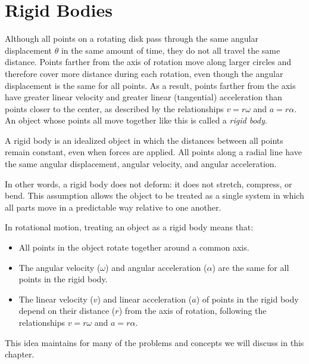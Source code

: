 \section{Rigid Bodies}
Although all points on a rotating disk pass through the same angular displacement $ \theta $ in the same amount of time, they do not all travel the same distance. Points farther from the axis of rotation move along larger circles and therefore cover more distance during each rotation, even though the angular displacement is the same for all points. As a result, points farther from the axis have greater linear velocity and greater linear (tangential) acceleration than points closer to the center, as described by the relationships $ v = r\omega $ and $ a = r\alpha $. An object whose points all move together like this is called a \emph{rigid body}.

A rigid body is an idealized object in which the distances between all points remain constant, even when forces are applied. All points along a radial line have the same angular displacement, angular velocity, and angular acceleration.

In other words, a rigid body does not deform: it does not stretch, compress, or bend. This assumption allows the object to be treated as a single system in which all parts move in a predictable way relative to one another.

In rotational motion, treating an object as a rigid body means that:

\begin{itemize}
  \item All points in the object rotate together around a common axis.
  \item The angular velocity ($\omega$) and angular acceleration ($\alpha$) are the same for all points in the rigid body.
  \item The linear velocity ($v$) and linear acceleration ($a$) of points in the rigid body depend on their distance ($r$) from the axis of rotation, following the relationships $v = r\omega$ and $a = r\alpha $.
\end{itemize}

This idea maintains for many of the problems and concepts we will discuss in this chapter.
